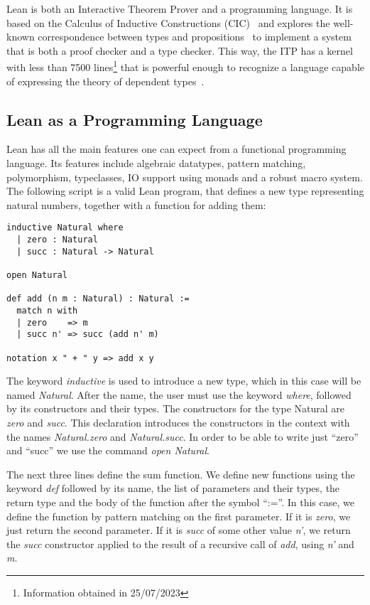 
Lean is both an Interactive Theorem Prover and a programming
language. It is based on the Calculus of Inductive Constructions (CIC)~\cite{cic_ref} and explores the well-known correspondence between types and propositions~\cite{ch_correspondence} to implement a system that is both a proof checker and a type checker. This way, the ITP has a kernel with less than 7500 lines\footnote{Information obtained in 25/07/2023} that is powerful enough to recognize a language capable of expressing the theory of dependent types~\cite{dep_type_theory}.

\subsection{Lean as a Programming Language}

Lean has all the main features one can expect from a functional programming language. Its features include algebraic datatypes, pattern matching, polymorphism, typeclasses, IO support using monads and a robust macro system. The following script is a valid Lean program, that defines a new type representing natural numbers, together with a function for adding them:

\begin{verbatim}
inductive Natural where
  | zero : Natural
  | succ : Natural -> Natural

open Natural

def add (n m : Natural) : Natural :=
  match n with
  | zero    => m
  | succ n' => succ (add n' m)

notation x " + " y => add x y
\end{verbatim}

The keyword \textit{inductive} is used to introduce a new type, which in this case will be named \textit{Natural}. After the name, the user must use the keyword \textit{where}, followed by its constructors and their types. The constructors for the type Natural are \textit{zero} and \textit{succ}. This declaration introduces the constructors in the context with the names \textit{Natural.zero} and \textit{Natural.succ}. In order to be able to write just ``zero'' and ``succ'' we use the command \textit{open Natural}.

The next three lines define the sum function. We define new functions using the keyword \textit{def} followed by its name, the list of parameters and their types, the return type and the body of the function after the symbol ``:=''. In this case, we define the function by pattern matching on the first parameter. If it is \textit{zero}, we just return the second parameter. If it is \textit{succ} of some other value \textit{n'}, we return the \textit{succ} constructor applied to the result of a recursive call of \textit{add}, using \textit{n'} and \textit{m}.

